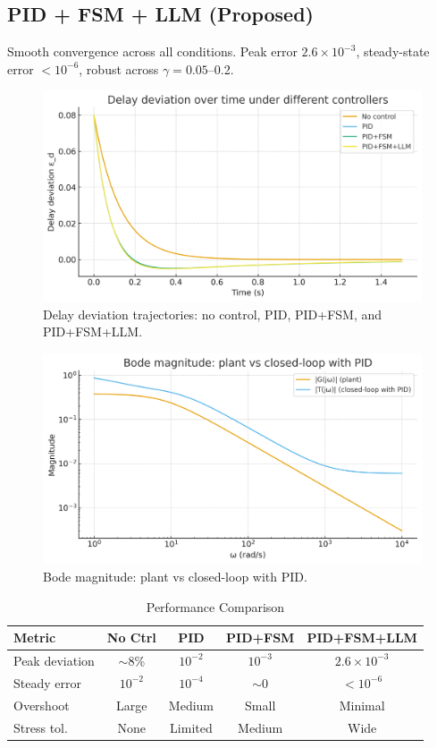 \documentclass[conference]{IEEEtran}
\begin{document}
\subsection{PID + FSM + LLM (Proposed)}
Smooth convergence across all conditions. Peak error $2.6 \times 10^{-3}$, steady-state error $<10^{-6}$, robust across $\gamma=0.05$--0.2.  
\begin{figure}[h]
\centering
\includegraphics[width=0.9\columnwidth]{fig2_time_response.png}
\caption{Delay deviation trajectories: no control, PID, PID+FSM, and PID+FSM+LLM.}
\label{fig:time}
\end{figure}
\begin{figure}[h]
\centering
\includegraphics[width=0.9\columnwidth]{fig3_bode_magnitude.png}
\caption{Bode magnitude: plant vs closed-loop with PID.}
\label{fig:bode}
\end{figure}
\begin{table}[h]
\renewcommand{\arraystretch}{1.1}
\caption{Performance Comparison}
\centering
\begin{tabular}{|l|c|c|c|c|}
\hline
Metric & No Ctrl & PID & PID+FSM & PID+FSM+LLM \\
\hline
Peak deviation & $\sim$8\% & $10^{-2}$ & $10^{-3}$ & $2.6\times 10^{-3}$ \\
Steady error   & $10^{-2}$ & $10^{-4}$ & $\sim$0 & $<10^{-6}$ \\
Overshoot      & Large     & Medium    & Small   & Minimal \\
Stress tol.    & None      & Limited   & Medium  & Wide \\
\hline
\end{tabular}
\end{table}
\end{document}
